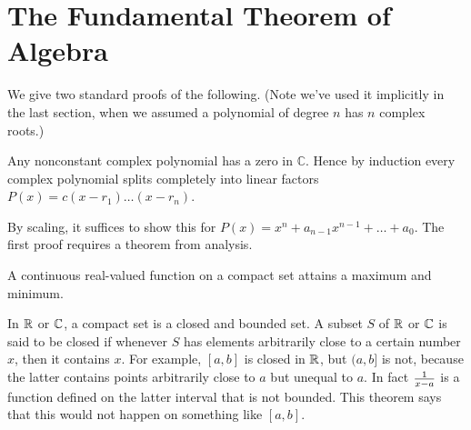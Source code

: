 \section{The Fundamental Theorem of Algebra}
We give two standard proofs of the following. (Note we've used it implicitly in the last section, when we assumed a polynomial of degree $n$ has $n$ complex roots.)
\begin{thm}
Any nonconstant complex polynomial has a zero in $\mathbb{C}$. 
Hence by induction every complex polynomial splits completely into linear factors $P(x)=c(x-r_1)\ldots (x-r_n)$.
\end{thm}
By scaling, it suffices to show this for $ P(x)=x^n+a_{n-1}x^{n-1}+\ldots +a_0$. The first proof requires a theorem from analysis.
\begin{thm}
A continuous real-valued function on a compact set attains a maximum and minimum.
\end{thm}
In $\mathbb{R}$ or $\mathbb{C}$, a compact set is a closed and bounded set. A subset $S$ of $\mathbb{R}$ or $\mathbb{C}$ is said to be closed if whenever $S$ has elements arbitrarily close to a certain number $x$, then it contains $x$. For example, $[a,b]$ is closed in $\mathbb{R}$, but $(a,b]$ is not, because the latter contains points arbitrarily close to $a$ but unequal to $a$. In fact $\frac{1}{x-a}$ is a function defined on the latter interval that is not bounded. This theorem says that this would not happen on something like $[a,b]$.

